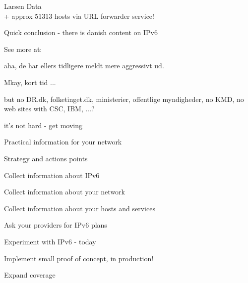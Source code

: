 \documentclass[28pt,landscape,a4paper,footrule]{foils}
\begin{document}

\begin{list1}
\item {}
\item {}
\item {}
\item {}
\item {}
\item {} Larsen Data\\
+ approx 51313 hosts via URL forwarder service!
\end{list1}
\vskip 1cm 

\centerline{\Large \color{titlecolor}Quick conclusion - there is danish content on IPv6}
\vskip 15mm 
See more at: 





aha, de har ellers tidligere meldt mere aggressivt ud.



Mkay, kort tid ...





but no DR.dk, folketinget.dk, ministerier, offentlige myndigheder, no KMD, no web sites with CSC, IBM, ...? 
\vskip 10mm
\centerline{\LARGE it's not hard - get moving}



Practical information for your network

\begin{list1}
\item Strategy and actions points
\begin{list2}
\item Collect information about IPv6 
\item Collect information about your network
\item Collect information about your hosts and services
\item Ask your providers for IPv6 plans
\item Experiment with IPv6 - today
\item Implement small proof of concept, in production!
\item Expand coverage
\end{list2}
\end{list1}
\end{document}

